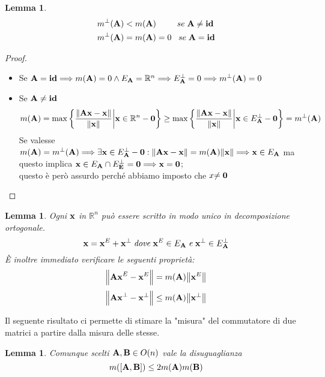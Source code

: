 \documentclass[a4paper]{book}
\newtheorem{lemma}[theorem]{Lemma}
\begin{document}
\begin{lemma}

\begin{equation}
\label{diseq:ma}
\begin{split}
m^{\perp}(\vb{A})  & < m(\vb{A}) \; \; \; \; \; \; \; \; \; se \; \vb{A \neq id}  \\
 m^{\perp}(\vb{A})  & = m(\vb{A}) = 0 \; \; \;  se \; \vb{A = id}
\end{split}
\end{equation}

\end{lemma}

\begin{proof}
\begin{itemize}
\item Se $\vb{A = id} \Longrightarrow m(\vb{A}) = 0 \land E_{\vb{A}} = \mathbb{R}^n \Longrightarrow E^{\perp}_{\vb{A}} = {0} \Longrightarrow m^{\perp}(\vb{A}) = 0$

\item Se $\vb{A \neq id}$ 
\[ m(\vb{A}) = \max \bigg\{ \frac{\norm{\vb{Ax-x}}}{\norm{\vb{x}}} \bigg|  \vb{x} \in \mathbb{R}^{n}-\vb{0} \bigg\} 
\geq \max \bigg\{ \frac{\norm{\vb{Ax-x}}}{\norm{\vb{x}}} \bigg|  \vb{x} \in E^{\perp}_{\vb{A}} - \vb{0} \bigg\} =  m^{\perp}(\vb{A}) \]
Se valesse $m(\vb{A}) = m^{\perp}(\vb{A}) \Longrightarrow \exists \vb{x} \in E^{\perp}_{\vb{A}} - \vb{0} : \norm{\vb{Ax-x}} = m(\vb{A})\norm{\vb{x}} \Longrightarrow \vb{x} \in E_{\vb{A}}$  ma questo implica $\vb{x} \in E_{\vb{A}} \cap E^{\perp}_{\vb{E}} = {\vb{0}} \Longrightarrow \vb{x = 0} $;  \\
questo è però assurdo perché abbiamo imposto che $x\vb{ \neq 0}$ 
\end{itemize}
\end{proof}

\begin{lemma}
Ogni $\vb{x}$ in $\mathbb{R}^n $ può essere scritto in modo unico in decomposizione ortogonale. 
\[ \vb{x} = \vb{x}^E + \vb{x}^{\perp} \; \mathit{dove} \; \vb{x}^E \in E_{\vb{A}} \; \mathit{e} \; \vb{x}^{\perp} \in E^{\perp}_{\vb{A}} \]
\`E inoltre immediato verificare le seguenti proprietà:
\[ \norm{\vb{Ax}^E - \vb{x}^E }= m(\vb{A})\norm{\vb{x}^E} \] \[\norm{\vb{Ax}^{\perp} - \vb{x}^{\perp}} \leq m(\vb{A}) \norm{\vb{x}^{\perp}} \]
\end{lemma}

Il seguente risultato ci permette di stimare la "misura" del commutatore di due matrici a partire dalla misura delle stesse. 
\begin{lemma}
\label{lemma:2}
 Comunque scelti $\vb{ A, B} \in O(n)$ vale la disuguaglianza 
 \[ m([\vb{A,B}]) \leq 2m(\vb{A})m(\vb{B}) \]
\end{lemma}
\end{document}
